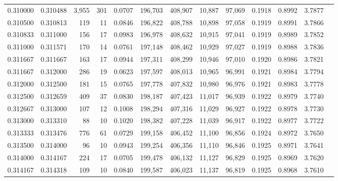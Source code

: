 \begin{tabular}{rrrrrrrrrrrrr}
0.310000 & 0.310488 & 3,955 & 301 &                                     0.0707 & 196,703 & 408,907 &  10,887 &  97,069 & 0.1918 & 0.8992 & 3.7877 \\
0.310500 & 0.310813 &   119 &  11 &                                     0.0846 & 196,822 & 408,788 &  10,898 &  97,058 & 0.1919 & 0.8991 & 3.7866 \\
0.310833 & 0.311000 &   156 &  17 &                                     0.0983 & 196,978 & 408,632 &  10,915 &  97,041 & 0.1919 & 0.8989 & 3.7852 \\
0.311000 & 0.311571 &   170 &  14 &                                     0.0761 & 197,148 & 408,462 &  10,929 &  97,027 & 0.1919 & 0.8988 & 3.7836 \\
0.311667 & 0.311667 &   163 &  17 &                                     0.0944 & 197,311 & 408,299 &  10,946 &  97,010 & 0.1920 & 0.8986 & 3.7821 \\
0.311667 & 0.312000 &   286 &  19 &                                     0.0623 & 197,597 & 408,013 &  10,965 &  96,991 & 0.1921 & 0.8984 & 3.7794 \\
0.312000 & 0.312500 &   181 &  15 &                                     0.0765 & 197,778 & 407,832 &  10,980 &  96,976 & 0.1921 & 0.8983 & 3.7778 \\
0.312500 & 0.312659 &   409 &  37 &                                     0.0830 & 198,187 & 407,423 &  11,017 &  96,939 & 0.1922 & 0.8979 & 3.7740 \\
0.312667 & 0.313000 &   107 &  12 &                                     0.1008 & 198,294 & 407,316 &  11,029 &  96,927 & 0.1922 & 0.8978 & 3.7730 \\
0.313000 & 0.313310 &    88 &  10 &                                     0.1020 & 198,382 & 407,228 &  11,039 &  96,917 & 0.1922 & 0.8977 & 3.7722 \\
0.313333 & 0.313476 &   776 &  61 &                                     0.0729 & 199,158 & 406,452 &  11,100 &  96,856 & 0.1924 & 0.8972 & 3.7650 \\
0.313500 & 0.314000 &    96 &  10 &                                     0.0943 & 199,254 & 406,356 &  11,110 &  96,846 & 0.1925 & 0.8971 & 3.7641 \\
0.314000 & 0.314167 &   224 &  17 &                                     0.0705 & 199,478 & 406,132 &  11,127 &  96,829 & 0.1925 & 0.8969 & 3.7620 \\
0.314167 & 0.314318 &   109 &  10 &                                     0.0840 & 199,587 & 406,023 &  11,137 &  96,819 & 0.1925 & 0.8968 & 3.7610 \\

\end{tabular}
